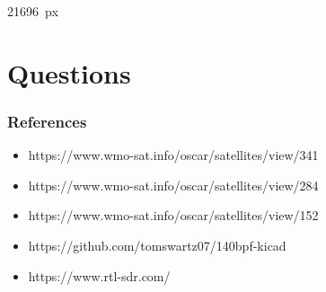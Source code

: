 \documentclass[]{beamer}
\begin{document}
{
\begin{frame}[plain]
    \hfill{\tiny{21696~px}}
\end{frame}}

\section{Questions}
\frame{\sectionpage}

\begin{frame}
    \frametitle{References}
    \begin{itemize}
        \item https://www.wmo-sat.info/oscar/satellites/view/341
        \item https://www.wmo-sat.info/oscar/satellites/view/284
        \item https://www.wmo-sat.info/oscar/satellites/view/152
        \item https://github.com/tomswartz07/140bpf-kicad
        \item https://www.rtl-sdr.com/
    \end{itemize}
\end{frame}
\end{document}
